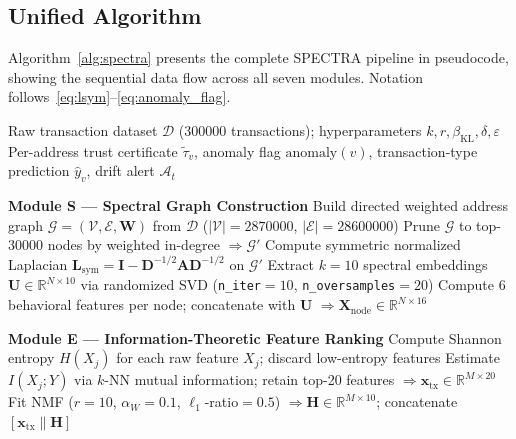 \documentclass[journal]{IEEEtran}
\begin{document}
\subsection{Unified Algorithm}
\label{sec:algorithm}

Algorithm~\ref{alg:spectra} presents the complete \textsc{SPECTRA} pipeline
in pseudocode, showing the sequential data flow across all seven modules.
Notation follows~\eqref{eq:lsym}--\eqref{eq:anomaly_flag}.

\begin{algorithm}[t]
\caption{\textsc{SPECTRA} — Spectral-Probabilistic Ensemble Clustering for
         Transaction Recognition and Authentication}
\label{alg:spectra}
\begin{algorithmic}[1]
\Require Raw transaction dataset $\mathcal{D}$ (\num{300000} transactions);
         hyperparameters $k, r, \beta_{\mathrm{KL}}, \delta, \varepsilon$
\Ensure  Per-address trust certificate $\tilde{\tau}_v$,
         anomaly flag $\mathrm{anomaly}(v)$,
         transaction-type prediction $\hat{y}_v$,
         drift alert $\mathcal{A}_t$

\Statex
\Statex \textbf{Module S — Spectral Graph Construction}
\State Build directed weighted address graph
       $\mathcal{G}=(\mathcal{V},\mathcal{E},\mathbf{W})$
       from $\mathcal{D}$\quad
       ($|\mathcal{V}|=\num{2870000}$, $|\mathcal{E}|=\num{28600000}$)
\State Prune $\mathcal{G}$ to top-\num{30000} nodes by weighted in-degree
       $\Rightarrow \mathcal{G}'$
\State Compute symmetric normalized Laplacian
       $\mathbf{L}_{\mathrm{sym}} = \mathbf{I} -
        \mathbf{D}^{-1/2}\mathbf{A}\mathbf{D}^{-1/2}$
       on $\mathcal{G}'$
\State Extract $k=10$ spectral embeddings
       $\mathbf{U} \in \mathbb{R}^{N \times 10}$
       via randomized SVD (\texttt{n\_iter}$=10$, \texttt{n\_oversamples}$=20$)
\State Compute 6 behavioral features per node; concatenate with $\mathbf{U}$
       $\Rightarrow \mathbf{X}_{\mathrm{node}} \in \mathbb{R}^{N \times 16}$

\Statex
\Statex \textbf{Module E — Information-Theoretic Feature Ranking}
\State Compute Shannon entropy $H(X_j)$ for each raw feature $X_j$;
       discard low-entropy features
\State Estimate $I(X_j; Y)$ via $k$-NN mutual information;
       retain top-20 features
       $\Rightarrow \mathbf{x}_{\mathrm{tx}} \in \mathbb{R}^{M \times 20}$
\State Fit NMF ($r=10$, $\alpha_W=0.1$, $\ell_1$-ratio$=0.5$)
       $\Rightarrow \mathbf{H} \in \mathbb{R}^{M \times 10}$;
       concatenate $[\mathbf{x}_{\mathrm{tx}} \| \mathbf{H}]$


\end{algorithmic}
\end{algorithm}
\end{document}
